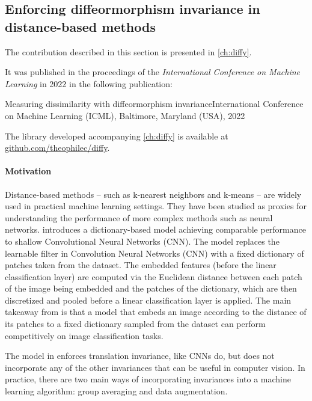 \subsection{Enforcing diffeormorphism invariance in distance-based methods}\label{sec:contributions-ch2}
\begin{mdframed}
The contribution described in this section is presented in \cref{ch:diffy}.

\noindent It was published in the proceedings of the \emph{International Conference on Machine Learning} in 2022 in the following publication:
\begin{mdframed}
{Measuring dissimilarity with diffeormorphism invariance}{International Conference on Machine Learning (ICML), Baltimore, Maryland (USA), 2022}
\end{mdframed}
The library developed accompanying \cref{ch:diffy} is available at \url{github.com/theophilec/diffy}.
\end{mdframed}

\paragraph{Motivation}
Distance-based methods -- such as k-nearest neighbors and k-means -- are widely used in practical machine learning settings. They have been studied as proxies for understanding the performance of more complex methods such as neural networks. \cite{thiry} introduces a dictionary-based model achieving comparable performance to shallow Convolutional Neural Networks (CNN). The model replaces the learnable filter in Convolution Neural Networks (CNN) with a fixed dictionary of patches taken from the dataset. The embedded features (before the linear classification layer) are computed via the Euclidean distance between each patch of the image being embedded and the patches of the dictionary, which are then discretized and pooled before a linear classification layer is applied. The main takeaway from \cite{thiry} is that a model that embeds an image according to the distance of its patches to a fixed dictionary sampled from the dataset can perform competitively on image classification tasks.

The model in \cite{thiry} enforces translation invariance, like CNNs do, but does not incorporate any of the other invariances that can be useful in computer vision. In practice, there are two main ways of incorporating invariances into a machine learning algorithm: group averaging and data augmentation.

